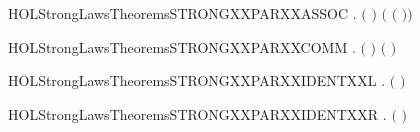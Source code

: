\newcommand{\HOLStrongLawsTheoremsSTRONGXXLEFTXXSUMXXMIDXXIDEMP}{\UseVerbatim{HOLStrongLawsTheoremsSTRONGXXLEFTXXSUMXXMIDXXIDEMP}}
\begin{SaveVerbatim}{HOLStrongLawsTheoremsSTRONGXXPARXXASSOC}
\HOLTokenTurnstile{} \HOLSymConst{\HOLTokenForall{}}  .  \ensuremath{(} \HOLSymConst{\ensuremath{\mid}}  \HOLSymConst{\ensuremath{\mid}} \ensuremath{)} \ensuremath{(} \HOLSymConst{\ensuremath{\mid}} \ensuremath{(} \HOLSymConst{\ensuremath{\mid}} \ensuremath{)}\ensuremath{)}
\end{SaveVerbatim}
\newcommand{\HOLStrongLawsTheoremsSTRONGXXPARXXASSOC}{\UseVerbatim{HOLStrongLawsTheoremsSTRONGXXPARXXASSOC}}
\begin{SaveVerbatim}{HOLStrongLawsTheoremsSTRONGXXPARXXCOMM}
\HOLTokenTurnstile{} \HOLSymConst{\HOLTokenForall{}} .  \ensuremath{(} \HOLSymConst{\ensuremath{\mid}} \ensuremath{)} \ensuremath{(} \HOLSymConst{\ensuremath{\mid}} \ensuremath{)}
\end{SaveVerbatim}
\newcommand{\HOLStrongLawsTheoremsSTRONGXXPARXXCOMM}{\UseVerbatim{HOLStrongLawsTheoremsSTRONGXXPARXXCOMM}}
\begin{SaveVerbatim}{HOLStrongLawsTheoremsSTRONGXXPARXXIDENTXXL}
\HOLTokenTurnstile{} \HOLSymConst{\HOLTokenForall{}}.  \ensuremath{(} \HOLSymConst{\ensuremath{\mid}} \ensuremath{)} 
\end{SaveVerbatim}
\newcommand{\HOLStrongLawsTheoremsSTRONGXXPARXXIDENTXXL}{\UseVerbatim{HOLStrongLawsTheoremsSTRONGXXPARXXIDENTXXL}}
\begin{SaveVerbatim}{HOLStrongLawsTheoremsSTRONGXXPARXXIDENTXXR}
\HOLTokenTurnstile{} \HOLSymConst{\HOLTokenForall{}}.  \ensuremath{(} \HOLSymConst{\ensuremath{\mid}} \ensuremath{)} 
\end{SaveVerbatim}
\newcommand{\HOLStrongLawsTheoremsSTRONGXXPARXXIDENTXXR}{\UseVerbatim{HOLStrongLawsTheoremsSTRONGXXPARXXIDENTXXR}}
